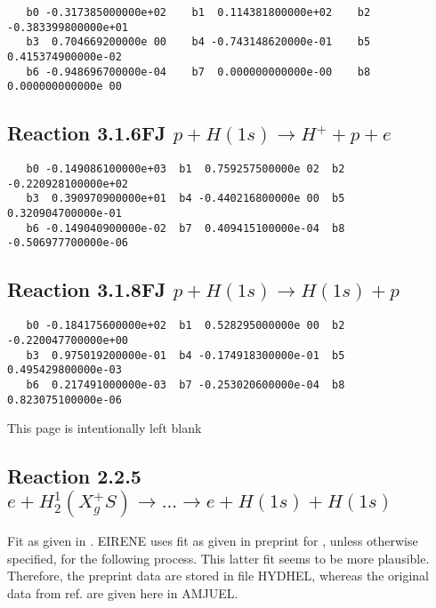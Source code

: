 \documentclass[12pt]{article}
\begin{document}
\begin{small}\begin{verbatim}
   b0 -0.317385000000e+02    b1  0.114381800000e+02    b2 -0.383399800000e+01
   b3  0.704669200000e 00    b4 -0.743148620000e-01    b5  0.415374900000e-02
   b6 -0.948696700000e-04    b7  0.000000000000e-00    b8  0.000000000000e 00
\end{verbatim}\end{small}

\subsection{
Reaction 3.1.6FJ  $p + H(1s) \rightarrow H^+ + p + e$
}


\begin{small}\begin{verbatim}
   b0 -0.149086100000e+03  b1  0.759257500000e 02  b2 -0.220928100000e+02
   b3  0.390970900000e+01  b4 -0.440216800000e 00  b5  0.320904700000e-01
   b6 -0.149040900000e-02  b7  0.409415100000e-04  b8 -0.506977700000e-06
\end{verbatim}\end{small}

\subsection{
Reaction 3.1.8FJ  $p + H(1s) \rightarrow H(1s) + p  $
}


\begin{small}\begin{verbatim}
   b0 -0.184175600000e+02  b1  0.528295000000e 00  b2 -0.220047700000e+00
   b3  0.975019200000e-01  b4 -0.174918300000e-01  b5  0.495429800000e-03
   b6  0.217491000000e-03  b7 -0.253020600000e-04  b8  0.823075100000e-06
\end{verbatim}\end{small}

\newpage
This page is intentionally left blank
\newpage


\subsection{
Reaction 2.2.5
$e + H_2^1 (X_g^+ S ) \rightarrow . . .\rightarrow e + H(1s) + H(1s)$}


Fit as given in \cite{kn:Janev}.
      EIRENE uses fit as given in preprint for \cite{kn:Janev},
      unless otherwise specified, for the following process.
      This latter fit seems to be more plausible. Therefore, the
      preprint data are stored in file HYDHEL, whereas the original
      data from ref.\cite{kn:Janev} are given here in AMJUEL.
\end{document}
